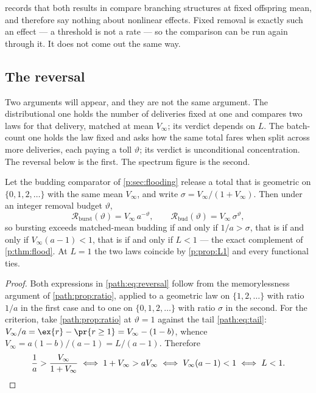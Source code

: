  records that both results in \ChPop{} compare
branching structures at fixed offspring mean, and therefore say nothing
about nonlinear effects. Fixed removal is exactly such an effect --- a
threshold is not a rate --- so the comparison can be run again through it.
It does not come out the same way.

\subsection{The reversal}
\label{path:sec:reversal}

Two arguments will appear, and they are not the same argument. The
distributional one holds the number of deliveries fixed at one and compares
two laws for that delivery, matched at mean $V_\infty$; its verdict depends
on $L$. The batch-count one holds the law fixed and asks how the same total
fares when split across more deliveries, each paying a toll $\vartheta$;
its verdict is unconditional concentration. The reversal below is the
first. The spectrum figure is the second.

\begin{proposition}
\label{path:prop:reversal}
Let the budding comparator of \cref{p:sec:flooding} release a total that is
geometric on $\{0,1,2,\dots\}$ with the same mean $V_\infty$, and write
$\sigma=V_\infty/(1+V_\infty)$. Then under an integer removal budget
$\vartheta$,
\begin{equation}
\mathcal{R}_{\mathrm{burst}}(\vartheta)=V_\infty\,a^{-\vartheta},
\qquad
\mathcal{R}_{\mathrm{bud}}(\vartheta)=V_\infty\,\sigma^{\vartheta},
\label{path:eq:reversal}
\end{equation}
so bursting exceeds matched-mean budding if and only if $1/a>\sigma$, that
is if and only if $V_\infty(a-1)<1$, that is if and only if $L<1$ --- the
exact complement of \cref{p:thm:flood}. At $L=1$ the two laws coincide by
\cref{p:prop:L1} and every functional ties.
\end{proposition}

\begin{proof}
Both expressions in \cref{path:eq:reversal} follow from the memorylessness
argument of \cref{path:prop:ratio}, applied to a geometric law on
$\{1,2,\dots\}$ with ratio $1/a$ in the first case and to one on
$\{0,1,2,\dots\}$ with ratio $\sigma$ in the second. For the criterion,
take \cref{path:prop:ratio} at $\vartheta=1$ against the tail
\cref{path:eq:tail}: $V_\infty/a=\ex{r}-\pr{r\ge1}=V_\infty-(1-b)$, whence
$V_\infty=a(1-b)/(a-1)=L/(a-1)$. Therefore
\[
\frac1a>\frac{V_\infty}{1+V_\infty}
\iff 1+V_\infty>aV_\infty
\iff V_\infty(a-1)<1
\iff L<1. \qedhere
\]
\end{proof}

